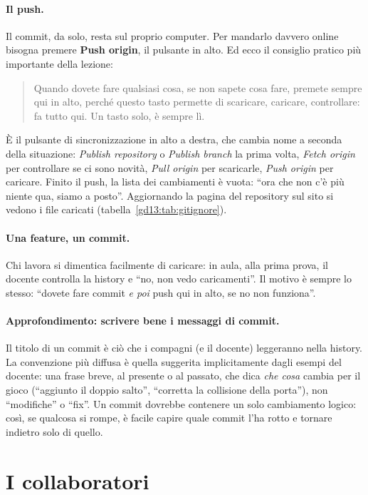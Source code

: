 \paragraph{Il push.} Il commit, da solo, resta sul proprio computer. Per
mandarlo davvero online bisogna premere \textbf{Push origin}, il pulsante in
alto. Ed ecco il consiglio pratico più importante della lezione:
\begin{quote}
Quando dovete fare qualsiasi cosa, se non sapete cosa fare, premete sempre qui
in alto, perché questo tasto permette di scaricare, caricare, controllare: fa
tutto qui. Un tasto solo, è sempre lì.
\end{quote}
È il pulsante di sincronizzazione in alto a destra, che cambia nome a seconda
della situazione: \emph{Publish repository} o \emph{Publish branch} la prima
volta, \emph{Fetch origin} per controllare se ci sono novità, \emph{Pull
origin} per scaricarle, \emph{Push origin} per caricare. Finito il push, la
lista dei cambiamenti è vuota: ``ora che non c'è più niente qua, siamo a
posto''. Aggiornando la pagina del repository sul sito si vedono i file caricati
(tabella~\ref{gd13:tab:gitignore}).

\paragraph{Una feature, un commit.} Chi lavora si dimentica facilmente di
caricare: in aula, alla prima prova, il docente controlla la history e ``no, non
vedo caricamenti''. Il motivo è sempre lo stesso: ``dovete fare commit
\emph{e poi} push qui in alto, se no non funziona''.

\paragraph{Approfondimento: scrivere bene i messaggi di commit.} Il titolo di un
commit è ciò che i compagni (e il docente) leggeranno nella history. La
convenzione più diffusa è quella suggerita implicitamente dagli esempi del
docente: una frase breve, al presente o al passato, che dica \emph{che cosa}
cambia per il gioco (``aggiunto il doppio salto'', ``corretta la collisione
della porta''), non ``modifiche'' o ``fix''. Un commit dovrebbe contenere un
solo cambiamento logico: così, se qualcosa si rompe, è facile capire quale
commit l'ha rotto e tornare indietro solo di quello.

\section{I collaboratori}
\label{gd13:sec:collaboratori}

